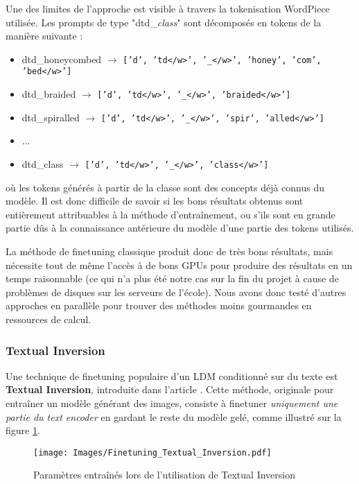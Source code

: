\documentclass{article}
\begin{document}
Une des limites de l'approche est visible à travers la tokenisation WordPiece \cite{WordPiece} utilisée. Les prompts de type "dtd\_\textit{class}" sont décomposés en tokens de la manière suivante :
\begin{itemize}[noitemsep,topsep=0pt,parsep=0pt,partopsep=0pt]
    \item dtd\_honeycombed $\rightarrow$ \texttt{['d', 'td</w>', '\_</w>', 'honey', 'com', 'bed</w>']}
    \item dtd\_braided $\rightarrow$ \texttt{['d', 'td</w>', '\_</w>', 'braided</w>']}
    \item dtd\_spiralled $\rightarrow$ \texttt{['d', 'td</w>', '\_</w>', 'spir', 'alled</w>']}
    \item ...
    \item dtd\_class $\rightarrow$ \texttt{['d', 'td</w>', '\_</w>', 'class</w>']}
\end{itemize}
où les tokens générés à partir de la classe sont des concepts déjà connus du modèle. Il est donc difficile de savoir si les bons résultats obtenus sont entièrement attribuables à la méthode d'entraînement, ou s'ils sont en grande partie dûs à la connaissance antérieure du modèle d'une partie des tokens utilisés.

La méthode de finetuning classique produit donc de très bons résultats, mais nécessite tout de même l'accès à de bons GPUs pour produire des résultats en un temps raisonnable (ce qui n'a plus été notre cas sur la fin du projet à cause de problèmes de disques sur les serveurs de l'école). Nous avons donc testé d'autres approches en parallèle pour trouver des méthodes moins gourmandes en ressources de calcul.

\subsubsection{Textual Inversion}

Une technique de finetuning populaire d'un LDM conditionné sur du texte est \textbf{Textual Inversion}, introduite dans l'article \cite{Textual_Inversion}. Cette méthode, originale pour entraîner un modèle générant des images, consiste à finetuner \textit{uniquement une partie du text encoder} en gardant le reste du modèle gelé, comme illustré sur la figure \ref{finetune_ti}.
\begin{figure}[H]
    \centering
    \texttt{[image: Images/Finetuning\_Textual\_Inversion.pdf]}
    \caption{Paramètres entraînés lors de l'utilisation de Textual Inversion}
    \label{finetune_ti}
\end{figure}
\end{document}

